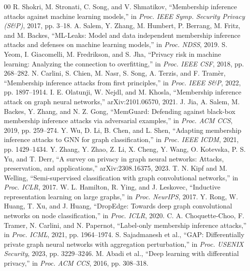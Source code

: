 \documentclass[conference]{IEEEtran}
\begin{document}
\begin{thebibliography}{00}
 R. Shokri, M. Stronati, C. Song, and V. Shmatikov, ``Membership inference attacks against machine learning models,'' in \emph{Proc. IEEE Symp. Security Privacy (S\&P)}, 2017, pp. 3--18.
 A. Salem, Y. Zhang, M. Humbert, P. Berrang, M. Fritz, and M. Backes, ``ML-Leaks: Model and data independent membership inference attacks and defenses on machine learning models,'' in \emph{Proc. NDSS}, 2019.
 S. Yeom, I. Giacomelli, M. Fredrikson, and S. Jha, ``Privacy risk in machine learning: Analyzing the connection to overfitting,'' in \emph{Proc. IEEE CSF}, 2018, pp. 268--282.
 N. Carlini, S. Chien, M. Nasr, S. Song, A. Terzis, and F. Tram\`er, ``Membership inference attacks from first principles,'' in \emph{Proc. IEEE S\&P}, 2022, pp. 1897--1914.
 I. E. Olatunji, W. Nejdl, and M. Khosla, ``Membership inference attack on graph neural networks,'' arXiv:2101.06570, 2021.
 J. Jia, A. Salem, M. Backes, Y. Zhang, and N. Z. Gong, ``MemGuard: Defending against black-box membership inference attacks via adversarial examples,'' in \emph{Proc. ACM CCS}, 2019, pp. 259--274.
 Y. Wu, D. Li, B. Chen, and L. Shen, ``Adapting membership inference attacks to GNN for graph classification,'' in \emph{Proc. IEEE ICDM}, 2021, pp. 1429--1434.
 Y. Zhang, Y. Zhao, Z. Li, X. Cheng, Y. Wang, O. Kotevska, P. S. Yu, and T. Derr, ``A survey on privacy in graph neural networks: Attacks, preservation, and applications,'' arXiv:2308.16375, 2023.
 T. N. Kipf and M. Welling, ``Semi-supervised classification with graph convolutional networks,'' in \emph{Proc. ICLR}, 2017.
 W. L. Hamilton, R. Ying, and J. Leskovec, ``Inductive representation learning on large graphs,'' in \emph{Proc. NeurIPS}, 2017.
 Y. Rong, W. Huang, T. Xu, and J. Huang, ``DropEdge: Towards deep graph convolutional networks on node classification,'' in \emph{Proc. ICLR}, 2020.
 C. A. Choquette-Choo, F. Tramer, N. Carlini, and N. Papernot, ``Label-only membership inference attacks,'' in \emph{Proc. ICML}, 2021, pp. 1964--1974.
 S. Sajadmanesh et al., ``GAP: Differentially private graph neural networks with aggregation perturbation,'' in \emph{Proc. USENIX Security}, 2023, pp. 3229--3246.
 M. Abadi et al., ``Deep learning with differential privacy,'' in \emph{Proc. ACM CCS}, 2016, pp. 308--318.

\end{thebibliography}
\end{document}
